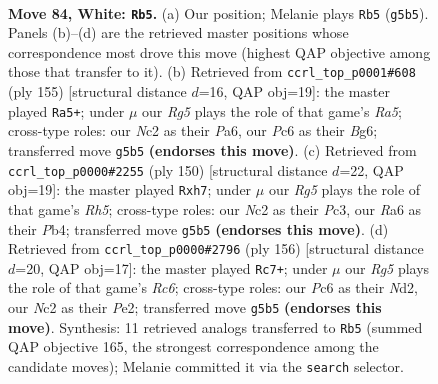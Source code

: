 \documentclass[11pt]{article}
\begin{document}
\clearpage

\begin{figure}[p]\centering
\begin{subfigure}{0.46\textwidth}\centering
\resizebox{\linewidth}{!}{%
\newchessgame
\chessboard[
  setfen={7k/5rb1/R1P5/6R1/7K/8/2N5/8 w - - 7 84},
  showmover=false,
  pgfstyle=straightmove, color=movearrow, markmove={g5-b5}
]}
\caption{}
\end{subfigure}\hfill
\begin{subfigure}{0.46\textwidth}\centering
\resizebox{\linewidth}{!}{%
\newchessgame
\chessboard[
  setfen={8/8/p5bk/4K3/r1BB4/8/8/2R5 b - - 10 78},
  showmover=false,
  pgfstyle=straightmove, color=movearrow, markmove={a4-a5}
]}
\caption{}
\end{subfigure}
\\[4pt]
\begin{subfigure}{0.46\textwidth}\centering
\resizebox{\linewidth}{!}{%
\newchessgame
\chessboard[
  setfen={8/7p/5k2/4b2R/1P6/2P2K2/8/4r3 w - - 2 76},
  showmover=false,
  pgfstyle=straightmove, color=movearrow, markmove={h5-h7}
]}
\caption{}
\end{subfigure}\hfill
\begin{subfigure}{0.46\textwidth}\centering
\resizebox{\linewidth}{!}{%
\newchessgame
\chessboard[
  setfen={8/4k3/2R2b2/8/1r6/5K2/3NP3/8 w - - 9 79},
  showmover=false,
  pgfstyle=straightmove, color=movearrow, markmove={c6-c7}
]}
\caption{}
\end{subfigure}
\caption{\textbf{Move 84, White: \texttt{Rb5}.} (a) Our position; Melanie plays \texttt{Rb5} (\texttt{g5b5}). Panels (b)--(d) are the retrieved master positions whose correspondence most drove this move (highest QAP objective among those that transfer to it). (b) Retrieved from \texttt{ccrl\_top\_p0001\#608} (ply 155) [structural distance $d$=16, QAP obj=19]: the master played \texttt{Ra5+}; under $\mu$ our \emph{Rg5} plays the role of that game's \emph{Ra5}; cross-type roles: our \emph{N}c2 as their \emph{P}a6, our \emph{P}c6 as their \emph{B}g6; transferred move \texttt{g5b5} \textbf{(endorses this move)}. (c) Retrieved from \texttt{ccrl\_top\_p0000\#2255} (ply 150) [structural distance $d$=22, QAP obj=19]: the master played \texttt{Rxh7}; under $\mu$ our \emph{Rg5} plays the role of that game's \emph{Rh5}; cross-type roles: our \emph{N}c2 as their \emph{P}c3, our \emph{R}a6 as their \emph{P}b4; transferred move \texttt{g5b5} \textbf{(endorses this move)}. (d) Retrieved from \texttt{ccrl\_top\_p0000\#2796} (ply 156) [structural distance $d$=20, QAP obj=17]: the master played \texttt{Rc7+}; under $\mu$ our \emph{Rg5} plays the role of that game's \emph{Rc6}; cross-type roles: our \emph{P}c6 as their \emph{N}d2, our \emph{N}c2 as their \emph{P}e2; transferred move \texttt{g5b5} \textbf{(endorses this move)}. Synthesis: 11 retrieved analogs transferred to \texttt{Rb5} (summed QAP objective 165, the strongest correspondence among the candidate moves); Melanie committed it via the \texttt{search} selector.}
\label{fig:thought-m166}
\end{figure}
\end{document}
